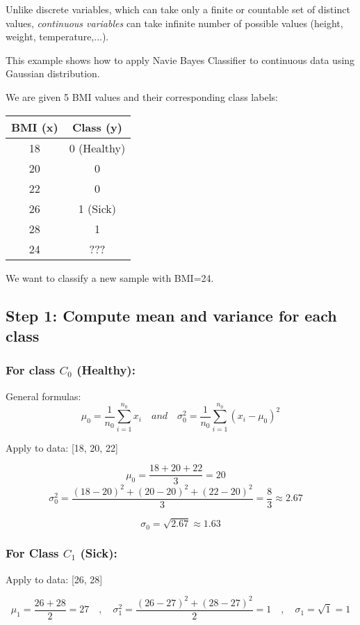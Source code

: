 \documentclass{article}
\begin{document}
Unlike discrete variables, which can take only a finite or countable set of distinct values, \textit{continuous variables} can take infinite number of possible values (height, weight, temperature,...).

This example shows how to apply Navie Bayes Classifier to continuous data using Gaussian distribution.

We are given 5 BMI values and their corresponding class labels:

\begin{center}
\begin{tabular}{|c|c|}
\hline
BMI (x) & Class (y) \\
\hline
18 & 0 (Healthy) \\
20 & 0 \\
22 & 0 \\
26 & 1 (Sick) \\
28 & 1 \\
24 & ??? \\
\hline
\end{tabular}
\end{center}

We want to classify a new sample with BMI=24.

\subsection*{Step 1: Compute mean and variance for each class}
\subsubsection*{For class $C_0$ (Healthy):}

General formulas:
$$
\mu _0 = \frac{1}{n_0} \sum_{i=1}^{n_0} x_i
\quad  and \quad 
\sigma_0^2 = \frac{1}{n_0} \sum_{i=1}^{n_0} (x_i - \mu  _0)^2
$$

Apply to data: [18, 20, 22]

$$
\mu_0 = \frac{18 + 20 + 22}{3} = 20
\quad
$$
$$
\sigma _0^2 = \frac{(18 - 20)^2 + (20 - 20)^2 + (22 - 20)^2}{3} = \frac{8}{3} \approx 2.67
\quad
$$


$$
\sigma_0 = \sqrt{2.67} \approx 1.63
$$

\subsubsection*{For Class $ C_1 $ (Sick):}
Apply to data: [26, 28]

$$
\mu _1 = \frac{26 + 28}{2} = 27
\quad , \quad
\sigma _1^2 = \frac{(26 - 27)^2 + (28 - 27)^2}{2} = 1
\quad , \quad
\sigma _1 = \sqrt{1} = 1
$$
\end{document}
